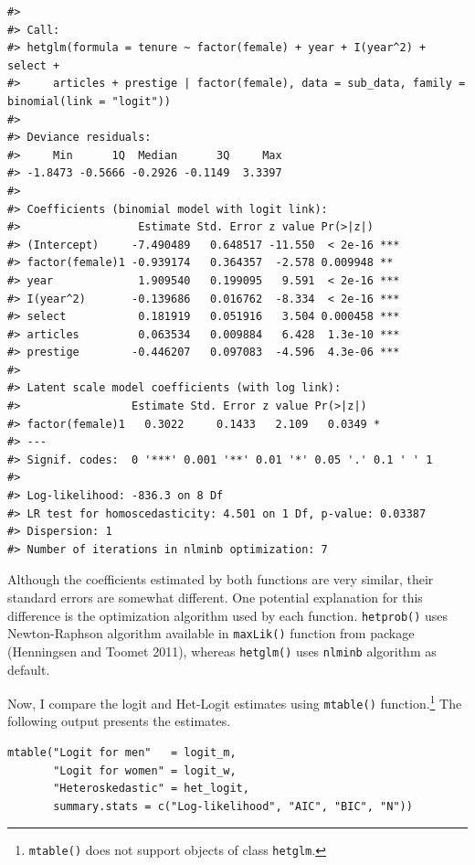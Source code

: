 \begin{verbatim}
#> 
#> Call:
#> hetglm(formula = tenure ~ factor(female) + year + I(year^2) + select + 
#>     articles + prestige | factor(female), data = sub_data, family = binomial(link = "logit"))
#> 
#> Deviance residuals:
#>     Min      1Q  Median      3Q     Max 
#> -1.8473 -0.5666 -0.2926 -0.1149  3.3397 
#> 
#> Coefficients (binomial model with logit link):
#>                  Estimate Std. Error z value Pr(>|z|)    
#> (Intercept)     -7.490489   0.648517 -11.550  < 2e-16 ***
#> factor(female)1 -0.939174   0.364357  -2.578 0.009948 ** 
#> year             1.909540   0.199095   9.591  < 2e-16 ***
#> I(year^2)       -0.139686   0.016762  -8.334  < 2e-16 ***
#> select           0.181919   0.051916   3.504 0.000458 ***
#> articles         0.063534   0.009884   6.428  1.3e-10 ***
#> prestige        -0.446207   0.097083  -4.596  4.3e-06 ***
#> 
#> Latent scale model coefficients (with log link):
#>                 Estimate Std. Error z value Pr(>|z|)  
#> factor(female)1   0.3022     0.1433   2.109   0.0349 *
#> ---
#> Signif. codes:  0 '***' 0.001 '**' 0.01 '*' 0.05 '.' 0.1 ' ' 1 
#> 
#> Log-likelihood: -836.3 on 8 Df
#> LR test for homoscedasticity: 4.501 on 1 Df, p-value: 0.03387
#> Dispersion: 1
#> Number of iterations in nlminb optimization: 7
\end{verbatim}

Although the coefficients estimated by both functions are very similar, their standard errors are somewhat different. One potential explanation for this difference is the optimization algorithm used by each function. \texttt{hetprob()} uses Newton-Raphson algorithm available in \texttt{maxLik()} function from  package (Henningsen and Toomet 2011), whereas \texttt{hetglm()} uses \texttt{nlminb} algorithm as default.

Now, I compare the logit and Het-Logit estimates using \texttt{mtable()} function.\footnote{\texttt{mtable()} does not support objects of class \texttt{hetglm}.} The following output presents the estimates.

\begin{verbatim}
mtable("Logit for men"   = logit_m,
       "Logit for women" = logit_w, 
       "Heteroskedastic" = het_logit,
       summary.stats = c("Log-likelihood", "AIC", "BIC", "N"))
\end{verbatim}

